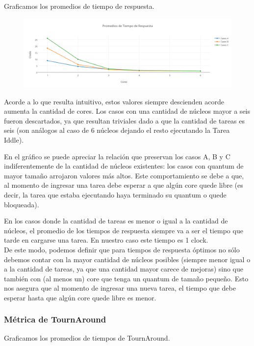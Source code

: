 \documentclass[a4paper]{article}
\begin{document}
Graficamos los promedios de tiempo de respuesta.
		 \begin{figure}[h!]
   \begin{center}
 	\includegraphics[scale=1.2]{imagenes/ej7/TiemposResp.png}
   \end{center}
 \end{figure} 
 
 Acorde a lo que resulta intuitivo, estos valores siempre descienden acorde aumenta la cantidad de cores. Los casos con una cantidad de n\'ucleos mayor a seis fueron descartados, ya que resultan triviales dado a que la cantidad de tareas es seis (son an\'alogos al caso de 6 n\'ucleos dejando el resto ejecutando la Tarea Iddle).
 
 En el gr\'afico se puede apreciar la relaci\'on que preservan los casos A, B y C indiferentemente de la cantidad de n\'ucleos existentes: los casos con quantum de mayor tama\~no arrojaron valores m\'as altos. Este comportamiento se debe a que, al momento de ingresar una tarea debe esperar a que alg\'un core quede libre (es decir, la tarea que estaba ejecutando haya terminado su quantum o quede bloqueada).
 
 En los casos donde la cantidad de tareas es menor o igual a la cantidad de n\'ucleos, el promedio de los tiempos de respuesta siempre va a ser el tiempo que tarde en cargarse una tarea. En nuestro caso este tiempo es 1 clock.\\
 
 De este modo, podemos definir que para tiempos de respuesta \'optimos no s\'olo debemos contar con la mayor cantidad de n\'ucleos posibles (siempre menor igual o a la cantidad de tareas, ya que una cantidad mayor carece de mejoras) sino que tambi\'en con (al menos un) core que tenga un quantum de tama\~no peque\~no. Esto nos asegura que al momento de ingresar una nueva tarea, el tiempo que debe esperar hasta que alg\'un core quede libre es menor.

\newpage

\subsubsection*{M\'etrica de TournAround}
Graficamos los promedios de tiempos de TournAround.
\end{document}
